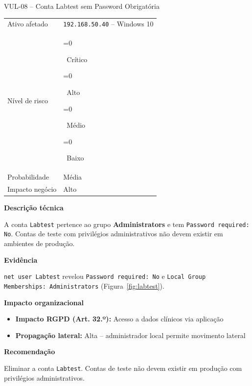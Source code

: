 \documentclass[12pt, a4paper]{report}
\newcommand{\risk}[1]{%
  \ifnum\pdfstrcmp{#1}{Critico}=0{\colorbox{Critical}{\color{white}\bfseries\footnotesize\strut~Crítico~}}\fi
  \ifnum\pdfstrcmp{#1}{Alto}=0{\colorbox{High}{\color{white}\bfseries\footnotesize\strut~Alto~}}\fi
  \ifnum\pdfstrcmp{#1}{Medio}=0{\colorbox{Medium}{\color{black}\bfseries\footnotesize\strut~Médio~}}\fi
  \ifnum\pdfstrcmp{#1}{Baixo}=0{\colorbox{Low}{\color{white}\bfseries\footnotesize\strut~Baixo~}}\fi}
\begin{document}
\begin{finding}{VUL-08 -- Conta Labtest sem Password Obrigatória}
\begin{tabular}{@{}ll@{}}
  \small\color{TextGray}Ativo afetado   & \texttt{192.168.50.40} -- Windows 10 \\[3pt]
  \small\color{TextGray}Nível de risco  & \risk{Alto} \\[3pt]
  \small\color{TextGray}Probabilidade   & Média \\[3pt]
  \small\color{TextGray}Impacto negócio & Alto \\
\end{tabular}

\vspace{8pt}\textbf{Descrição técnica}

A conta \texttt{Labtest} pertence ao grupo \textbf{Administrators} e tem
\texttt{Password required: No}. Contas de teste com privilégios administrativos não devem
existir em ambientes de produção.

\vspace{6pt}\textbf{Evidência}

\texttt{net user Labtest} revelou \texttt{Password required: No} e
\texttt{Local Group Memberships: Administrators} (Figura~\ref{fig:labtest}).

\vspace{4pt}\textbf{Impacto organizacional}
\begin{itemize}[itemsep=1pt]
  \item \textbf{Impacto RGPD (Art. 32.º):} Acesso a dados clínicos via aplicação
  \item \textbf{Propagação lateral:} Alta -- administrador local permite movimento lateral
\end{itemize}

\vspace{4pt}\textbf{Recomendação}

Eliminar a conta \texttt{Labtest}. Contas de teste não devem existir em produção com
privilégios administrativos.
\end{finding}

\vspace{0.8em}
\end{document}

